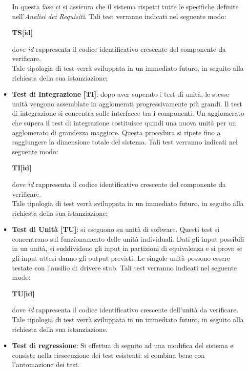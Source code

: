 \begin{itemize}
			In questa fase ci si assicura che il sistema rispetti tutte le specifiche definite nell'\textit{Analisi dei Requisiti}. Tali test verranno indicati nel seguente modo:\\
			\centerline{\textbf{TS[id]}}
			dove \textit{id} rappresenta il codice identificativo crescente del componente da
			verificare.\\
			Tale tipologia di test verrà sviluppata in un immediato futuro, in seguito alla richiesta della sua istanziazione;
			\item \textbf{Test di Integrazione [TI]}: dopo aver superato i test di unità, le stesse unità vengono assemblate in agglomerati progressivamente più grandi. Il test di integrazione si concentra sulle interfacce tra i componenti. Un agglomerato che supera il test di integrazione costituisce quindi una nuova unità per un agglomerato di grandezza maggiore. Questa procedura si ripete fino a raggiungere la dimensione totale del sistema. Tali test verranno indicati nel seguente modo:\\
			\centerline{\textbf{TI[id]}}
			dove \textit{id} rappresenta il codice identificativo crescente del componente da
			verificare.\\
			Tale tipologia di test verrà sviluppata in un immediato futuro, in seguito alla richiesta della sua istanziazione;
			\item \textbf{Test di Unità [TU]}: si eseguono su unità di software. Questi test si concentrano sul funzionamento delle unità individuali. Dati gli input possibili in un unità, si suddividono gli input in partizioni di equivalenza e si prova se gli input attesi danno gli output previsti. Le singole unità possono essere testate con l'ausilio di driver\glosp e stub\glo. Tali test verranno indicati nel
			seguente modo:\\
			\centerline{\textbf{TU[id]}}
			dove \textit{id} rappresenta il codice identificativo crescente dell'unità da verificare.\\
			Tale tipologia di test verrà sviluppata in un immediato futuro, in seguito alla richiesta della sua istanziazione.
			\item \textbf{Test di regressione}: Si effettua di seguito ad una modifica del sistema e consiste nella riesecuzione dei test esistenti: si combina bene con l'automazione dei test.
		\end{itemize}
		
